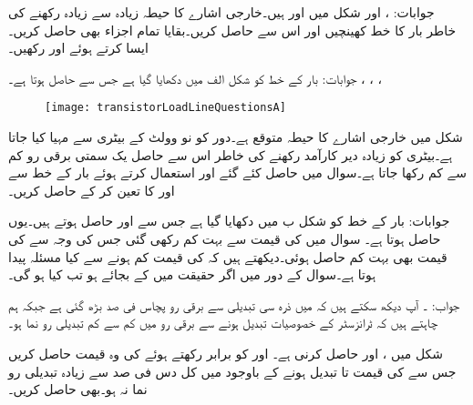 جوابات: ،  اور 
شکل  میں  اور  ہیں۔خارجی اشارے کا حیطہ زیادہ سے زیادہ رکھنے کی خاطر بار کا خط کھینچیں اور اس سے  حاصل کریں۔بقایا تمام اجزاء بھی حاصل کریں۔ایسا کرتے ہوئے    اور  رکھیں۔

جوابات: بار کے خط کو شکل  الف میں دکھایا گیا ہے جس سے  حاصل ہوتا ہے۔ ، ، ، 
\begin{figure}
\centering
\texttt{[image: transistorLoadLineQuestionsA]}
\caption{}
\label{شکل_سوال_ٹرانزسٹر_بار_خط_الف}
\end{figure}
شکل  میں خارجی اشارے کا حیطہ  متوقع ہے۔دور کو  نو وولٹ کے بیٹری سے  مہیا کیا جاتا ہے۔بیٹری کو زیادہ دیر کارآمد رکھنے کی خاطر اس سے حاصل یک سمتی برقی رو کم سے کم رکھا جاتا ہے۔سوال  میں حاصل کئے گئے  اور  استعمال کرتے ہوئے بار کے خط سے  اور  کا تعین کر کے  حاصل کریں۔

جوابات: بار کے خط کو شکل  ب میں دکھایا گیا ہے جس سے  اور  حاصل ہوتے ہیں۔یوں  حاصل ہوتا ہے۔
سوال  میں  کی قیمت  سے بہت کم رکھی گئی جس کی وجہ سے  کی قیمت بھی بہت کم حاصل ہوئی۔دیکھتے ہیں کہ  کی قیمت کم ہونے سے کیا مسئلہ پیدا ہوتا ہے۔سوال  کے دور میں اگر حقیقت میں  کے بجائے  ہو تب   کیا ہو گی۔

جواب: ۔ آپ دیکھ سکتے ہیں کہ  میں ذرہ سی تبدیلی سے برقی رو پچاس فی صد  بڑھ گئی ہے جبکہ ہم چاہتے ہیں کہ ٹرانزسٹر کے خصوصیات تبدیل ہونے سے برقی رو میں کم سے کم تبدیلی رو نما ہو۔

شکل  میں  ،  اور  حاصل کرنی ہے۔  اور  کو برابر رکھتے ہوئے  کی وہ قیمت حاصل کریں جس سے  کی قیمت  تا  تبدیل ہونے کے باوجود  میں کل دس فی صد سے زیادہ تبدیلی رو نما نہ ہو۔بھی حاصل کریں۔

